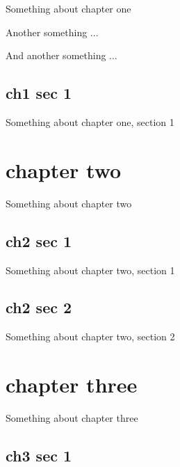 \documentclass[12pt, a4paper]{report}
\begin{document}
Something about chapter one

Another something ...

And another something ...

\section{ch1 sec 1}

Something about chapter one, section 1

\chapter{chapter two}

Something about chapter two

\section{ch2 sec 1}

Something about chapter two, section 1

\section{ch2 sec 2}

Something about chapter two, section 2

\chapter{chapter three}

Something about chapter three

\section{ch3 sec 1}
\end{document}
